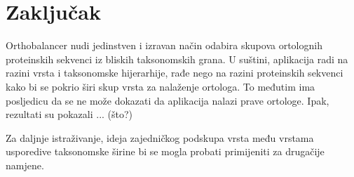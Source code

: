 \chapter{Zaključak}
\label{chap:zakljucak}

Orthobalancer nudi jedinstven i izravan način odabira skupova ortolognih
proteinskih sekvenci iz bliskih taksonomskih grana. U suštini, aplikacija radi
na razini vrsta i taksonomske hijerarhije, rađe nego na razini proteinskih
sekvenci kako bi se pokrio širi skup vrsta za nalaženje ortologa. To međutim ima
posljedicu da se ne može dokazati da aplikacija nalazi prave ortologe. Ipak,
rezultati su pokazali ... (što?)

Za daljnje istraživanje, ideja zajedničkog podskupa vrsta među vrstama
usporedive taksonomske širine bi se mogla probati primijeniti za drugačije
namjene.
